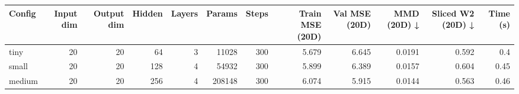 \begin{tabular}{lrrrrrrrrrrr}
\toprule
Config & Input dim & Output dim & Hidden & Layers & Params & Steps & Train MSE (20D) & Val MSE (20D) & MMD (20D) ↓ & Sliced W2 (20D) ↓ & Time (s) \\
\midrule
tiny & 20 & 20 & 64 & 3 & 11028 & 300 & 5.679 & 6.645 & 0.0191 & 0.592 & 0.4 \\
small & 20 & 20 & 128 & 4 & 54932 & 300 & 5.899 & 6.389 & 0.0157 & 0.604 & 0.45 \\
medium & 20 & 20 & 256 & 4 & 208148 & 300 & 6.074 & 5.915 & 0.0144 & 0.563 & 0.46 \\
\bottomrule
\end{tabular}
